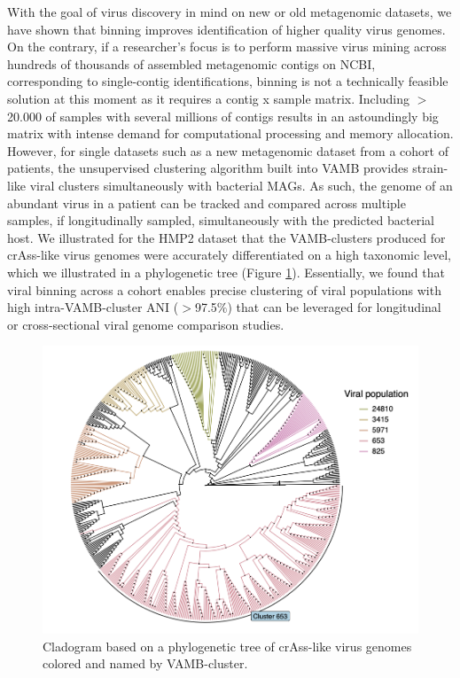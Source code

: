 \noindent
With the goal of virus discovery in mind on new or old metagenomic datasets, we have shown that binning improves identification of higher quality virus genomes. On the contrary, if a researcher's focus is to perform massive virus mining across hundreds of thousands of assembled metagenomic contigs on NCBI, corresponding to single-contig identifications, binning is not a technically feasible solution at this moment as it requires a contig x sample matrix. Including $>$20.000 of samples with several millions of contigs results in an astoundingly big matrix with intense demand for computational processing and memory allocation. However, for single datasets such as a new metagenomic dataset from a cohort of patients, the unsupervised clustering algorithm built into VAMB provides strain-like viral clusters simultaneously with bacterial MAGs. As such, the genome of an abundant virus in a patient can be tracked and compared across multiple samples, if longitudinally sampled, simultaneously with the predicted bacterial host. We illustrated for the HMP2 dataset that the VAMB-clusters produced for crAss-like virus genomes were accurately differentiated on a high taxonomic level, which we illustrated in a phylogenetic tree (Figure \ref{fig:crasstree}). Essentially, we found that viral binning across a cohort enables precise clustering of viral populations with high intra-VAMB-cluster ANI ($>$97.5$\%$) that can be leveraged for longitudinal or cross-sectional viral genome comparison studies.

\begin{figure}
  \begin{center}
    \includegraphics[scale=1,width=1\textwidth]{pictures/crasstree.png}
  \end{center}
  \caption[VirusTimeline]{Cladogram based on a phylogenetic tree of crAss-like virus genomes colored and named by VAMB-cluster.
  }
  \label{fig:crasstree}
\end{figure}

